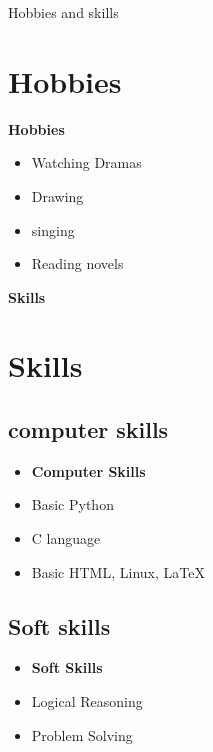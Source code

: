 \begin{frame}{Hobbies and skills} 
\section{Hobbies} 
\textbf{Hobbies} 
\begin{itemize} 
\item Watching Dramas
\item  Drawing
\item singing
\item Reading novels 
\end{itemize} 
\textbf{Skills} 
\section{Skills} 
\subsection{computer skills} 
\begin{itemize} 
\item \textbf{Computer Skills} 
\item Basic Python 
\item C language 
\item Basic HTML, Linux, \LaTeX{} 
\end{itemize} 
\subsection{Soft skills} 
\begin{itemize} 
\item \textbf{Soft Skills} 
\item Logical Reasoning 
\item Problem Solving 
\end{itemize} 
\end{frame} 
